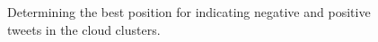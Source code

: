 \documentclass[journal]{vgtc}                %
\begin{document}
\begin{figure}[htp]
  \centering
  \quad
  \quad
\caption{Determining the best position for indicating negative and positive tweets in the cloud clusters.}
\label{fig:corners}
\end{figure}
\end{document}

